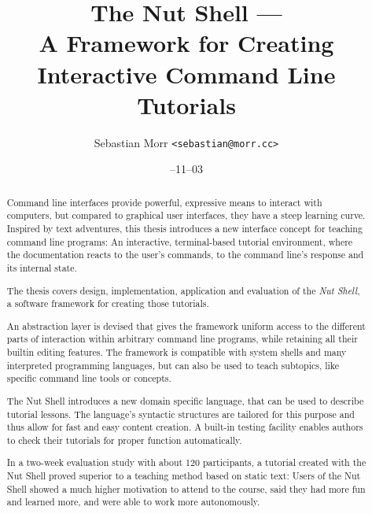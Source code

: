 \documentclass[paper=a4,twoside,abstract=on,cleardoublepage=empty,numbers=noenddot,toc=bib,toc=listof,12pt,appendixprefix=true]{scrreprt}
\title{The Nut Shell ---\\A Framework for Creating\\Interactive Command Line Tutorials}
\author{\sffamily Sebastian Morr \texttt{<sebastian@morr.cc>}}
\date{\sffamily 2013--11--03}
\begin{document}
\maketitle
\restoregeometry


\begin{abstract}
    Command line interfaces provide powerful, expressive means to interact with computers, but compared to graphical user interfaces, they have a steep learning curve. Inspired by text adventures, this thesis introduces a new interface concept for teaching command line programs: An interactive, terminal-based tutorial environment, where the documentation reacts to the user's commands, to the command line's response and its internal state.

    The thesis covers design, implementation, application and evaluation of the \emph{Nut Shell}, a software framework for creating those tutorials.

    An abstraction layer is devised that gives the framework uniform access to the different parts of interaction within arbitrary command line programs, while retaining all their builtin editing features. The framework is compatible with system shells and many interpreted programming languages, but can also be used to teach subtopics, like specific command line tools or concepts.

    The Nut Shell introduces a new domain specific language, that can be used to describe tutorial lessons. The language's syntactic structures are tailored for this purpose and thus allow for fast and easy content creation. A built-in testing facility enables authors to check their tutorials for proper function automatically.

    In a two-week evaluation study with about 120 participants, a tutorial created with the Nut Shell proved superior to a teaching method based on static text: Users of the Nut Shell showed a much higher motivation to attend to the course, said they had more fun and learned more, and were able to work more autonomously.
\end{abstract}
\end{document}
